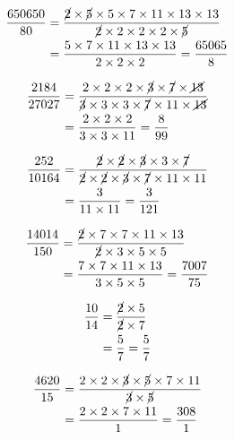 {{\item\begin{align*}
    \frac{650650}{80} &=
    \frac{\cancel{2} \times \cancel{5} \times 5 \times 7 \times 11 \times 13 \times 13}
    {\cancel{2} \times 2 \times 2 \times 2 \times \cancel{5}}\\ &=
    \frac{5 \times 7 \times 11 \times 13 \times 13}
    {2 \times 2 \times 2} =
    \frac{65065}{8}
    \end{align*}

\item\begin{align*}
    \frac{2184}{27027} &=
    \frac{2 \times 2 \times 2 \times \cancel{3} \times \cancel{7} \times \cancel{13}}
    {\cancel{3} \times 3 \times 3 \times \cancel{7} \times 11 \times \cancel{13}}\\ &=
    \frac{2 \times 2 \times 2}
    {3 \times 3 \times 11} =
    \frac{8}{99}
    \end{align*}

\item\begin{align*}
    \frac{252}{10164} &=
    \frac{\cancel{2} \times \cancel{2} \times \cancel{3} \times 3 \times \cancel{7}}
    {\cancel{2} \times \cancel{2} \times \cancel{3} \times \cancel{7} \times 11 \times 11}\\ &=
    \frac{3}
    {11 \times 11} =
    \frac{3}{121}
    \end{align*}

\item\begin{align*}
    \frac{14014}{150} &=
    \frac{\cancel{2} \times 7 \times 7 \times 11 \times 13}
    {\cancel{2} \times 3 \times 5 \times 5}\\ &=
    \frac{7 \times 7 \times 11 \times 13}
    {3 \times 5 \times 5} =
    \frac{7007}{75}
    \end{align*}

\item\begin{align*}
    \frac{10}{14} &=
    \frac{\cancel{2} \times 5}
    {\cancel{2} \times 7}\\ &=
    \frac{5}
    {7} =
    \frac{5}{7}
    \end{align*}

\item\begin{align*}
    \frac{4620}{15} &=
    \frac{2 \times 2 \times \cancel{3} \times \cancel{5} \times 7 \times 11}
    {\cancel{3} \times \cancel{5}}\\ &=
    \frac{2 \times 2 \times 7 \times 11}
    {1} =
    \frac{308}{1}
    \end{align*}

}}
